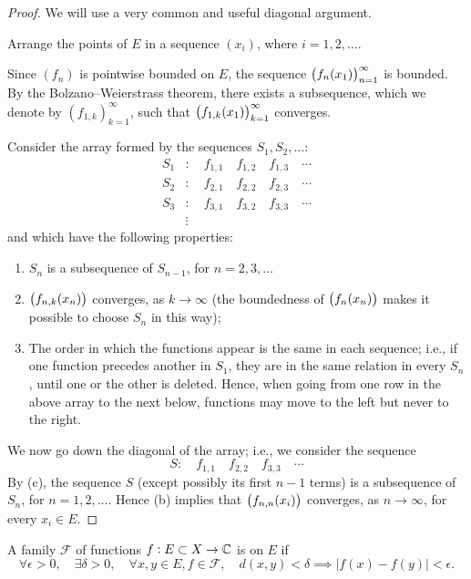 \begin{proof}
We will use a very common and useful diagonal argument.

Arrange the points of $E$ in a sequence $(x_i)$, where $i=1,2,\dots$. 

Since $(f_n)$ is pointwise bounded on $E$, the sequence $\left(f_n(x_1)\right)_{n=1}^{\infty}$ is bounded. By the Bolzano--Weierstrass theorem, there exists a subsequence, which we denote by $(f_{1,k})_{k=1}^{\infty}$, such that $\left(f_{1,k}(x_1)\right)_{k=1}^{\infty}$ converges.

Consider the array formed by the sequences $S_1,S_2,\dots$:
\begin{align*}
S_1&:\quad f_{1,1}\quad f_{1,2}\quad f_{1,3}\quad\cdots\\
S_2&:\quad f_{2,1}\quad f_{2,2}\quad f_{2,3}\quad\cdots\\
S_3&:\quad f_{3,1}\quad f_{3,2}\quad f_{3,3}\quad\cdots\\
&\vdots
\end{align*}
and which have the following properties:
\begin{enumerate}[label=(\roman*)]
\item $S_n$ is a subsequence of $S_{n-1}$, for $n=2,3,\dots$
\item $\left(f_{n,k}(x_n)\right)$ converges, as $k\to\infty$ (the boundedness of $\left(f_n(x_n)\right)$ makes it possible to choose $S_n$ in this way);
\item The order in which the functions appear is the same in each sequence; i.e., if one function precedes another in $S_1$, they are in the same relation in every $S_n$, until one or the other is deleted. Hence, when going from one row in the above array to the next below, functions may move to the left but never to the right.
\end{enumerate}

We now go down the diagonal of the array; i.e., we consider the sequence
\[S:\quad f_{1,1}\quad f_{2,2}\quad f_{3,3}\quad\cdots\]
By (c), the sequence $S$ (except possibly its first $n-1$ terms) is a subsequence of $S_n$, for $n=1,2,\dots$. Hence (b) implies that $\left(f_{n,n}(x_i)\right)$ converges, as $n\to\infty$, for every $x_i\in E$.
\end{proof}

\begin{definition}
A family $\mathscr{F}$ of functions $f:E\subset X\to\mathbb C$ is  on $E$ if
\[\forall\epsilon>0,\quad\exists\delta>0,\quad\forall x,y\in E,f\in\mathscr{F},\quad d(x,y)<\delta\implies|f(x)-f(y)|<\epsilon.\]
\end{definition}

